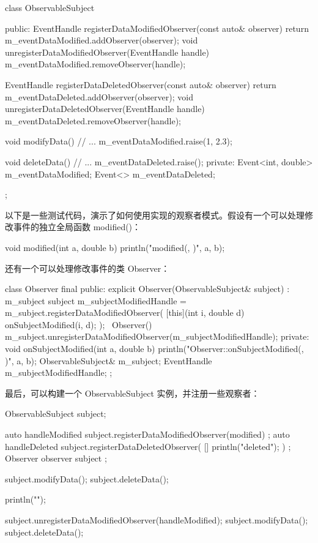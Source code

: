 \begin{cpp}
class ObservableSubject
{
    public:
        EventHandle registerDataModifiedObserver(const auto& observer) {
        return m_eventDataModified.addObserver(observer); }
        void unregisterDataModifiedObserver(EventHandle handle) {
            m_eventDataModified.removeObserver(handle); }

        EventHandle registerDataDeletedObserver(const auto& observer) {
            return m_eventDataDeleted.addObserver(observer); }
        void unregisterDataDeletedObserver(EventHandle handle) {
            m_eventDataDeleted.removeObserver(handle); }

        void modifyData()
        {
            // ...
            m_eventDataModified.raise(1, 2.3);
        }

        void deleteData()
        {
            // ...
            m_eventDataDeleted.raise();
        }
    private:
        Event<int, double> m_eventDataModified;
        Event<> m_eventDataDeleted;
};
\end{cpp}


以下是一些测试代码，演示了如何使用实现的观察者模式。假设有一个可以处理修改事件的独立全局函数 modified()：

\begin{cpp}
void modified(int a, double b) { println("modified({}, {})", a, b); }
\end{cpp}

还有一个可以处理修改事件的类 Observer：

\begin{cpp}
class Observer final
{
    public:
        explicit Observer(ObservableSubject& subject) : m_subject { subject }
        {
            m_subjectModifiedHandle = m_subject.registerDataModifiedObserver(
                [this](int i, double d) { onSubjectModified(i, d); });
        }
        ~Observer()
        {
            m_subject.unregisterDataModifiedObserver(m_subjectModifiedHandle);
        }
    private:
        void onSubjectModified(int a, double b)
        {
            println("Observer::onSubjectModified({}, {})", a, b);
        }
        ObservableSubject& m_subject;
        EventHandle m_subjectModifiedHandle;
};
\end{cpp}

最后，可以构建一个 ObservableSubject 实例，并注册一些观察者：

\begin{cpp}
ObservableSubject subject;

auto handleModified { subject.registerDataModifiedObserver(modified) };
auto handleDeleted { subject.registerDataDeletedObserver(
    []{ println("deleted"); }) };
Observer observer { subject };

subject.modifyData();
subject.deleteData();

println("");

subject.unregisterDataModifiedObserver(handleModified);
subject.modifyData();
subject.deleteData();
\end{cpp}

